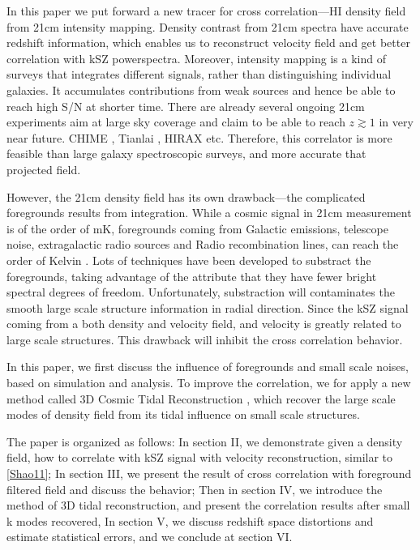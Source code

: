 In this paper we put forward a new tracer for cross correlation---HI density field from 21cm intensity mapping. 
Density contrast from 21cm spectra have accurate redshift information, 
which enables us to reconstruct velocity field and 
get better correlation with kSZ powerspectra. 
Moreover, intensity mapping is a kind of surveys that 
integrates different signals, 
rather than distinguishing individual galaxies. 
It accumulates contributions from weak sources 
and hence be able to reach high S/N at shorter time. 
There are already several ongoing 21cm experiments aim at large sky coverage and claim to be able to reach $z\gtrsim1$ in very near future.
CHIME \cite{2014SPIE.9145E..22B}, Tianlai \cite{2015ApJ...798...40X}, 
HIRAX \cite{HIRAX} etc.
Therefore, this correlator is more feasible than large galaxy spectroscopic surveys, 
and more accurate that projected field.

However, the 21cm density field has its own drawback---the complicated foregrounds results from integration. 
While a cosmic signal in 21cm measurement is of the order of mK,  
foregrounds coming from Galactic emissions, telescope noise, 
extragalactic radio sources and Radio recombination lines, 
can reach the order of Kelvin \cite{DiMatteo04}\cite{Masui13}. 
Lots of techniques have been developed to substract the foregrounds, 
taking advantage of the attribute that they have fewer bright spectral
degrees of freedom\cite{Switzer15}.
Unfortunately, substraction will contaminates the smooth large scale structure information in radial direction.
Since the kSZ signal coming from a both density and velocity field, 
and velocity is greatly related to large scale structures. 
This drawback will inhibit the cross correlation behavior.

In this paper, 
we first discuss the influence of foregrounds and small scale noises, 
based on simulation and analysis. 
To improve the correlation, we for apply a new method called 3D Cosmic Tidal Reconstruction \cite{2012:pen}\cite{2015:zhu}, which recover the large scale modes of density field from its tidal influence on small scale structures. 

The paper is organized as follows: 
In section II, we demonstrate given a density field, how to correlate with kSZ signal with velocity reconstruction, similar to \ref{Shao11}; 
In section III, we present the result of cross correlation with foreground filtered field 
and discuss the behavior; 
Then in section IV, we introduce the method of 3D tidal reconstruction, 
and present the correlation results after small k modes recovered, 
In section V, we discuss redshift space distortions and estimate statistical errors, 
and we conclude at section VI.


